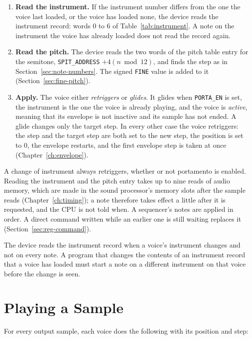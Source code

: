 \begin{enumerate}
	\item \textbf{Read the instrument.} If the instrument number differs from the one the voice last loaded, or the voice has
	      loaded none, the device reads the instrument record: words 0 to 6 of Table~\ref{tab:instrument}. A note on the
	      instrument the voice has already loaded does not read the record again.
	\item \textbf{Read the pitch.} The device reads the two words of the pitch table entry for the semitone,
	      \texttt{SPIT\_ADDRESS} $+ 4 (n \bmod 12)$, and finds the step as in Section~\ref{sec:note-numbers}. The signed
	      \texttt{FINE} value is added to it (Section~\ref{sec:fine-pitch}).
	\item \textbf{Apply.} The voice either \emph{retriggers} or \emph{glides}. It glides when \texttt{PORTA\_EN} is set, the
	      instrument is the one the voice is already playing, and the voice is \emph{active}, meaning that its envelope is not inactive and its sample has not ended. A glide changes only the target step. In every other case the voice retriggers: the step and the target
	      step are both set to the new step, the position is set to 0, the envelope restarts, and the first envelope step is taken
	      at once (Chapter~\ref{ch:envelope}).
\end{enumerate}

A change of instrument always retriggers, whether or not portamento is enabled. Reading the instrument and the pitch
entry takes up to nine reads of audio memory, which are made in the sound processor's memory slots after the sample
reads (Chapter~\ref{ch:timing}); a note therefore takes effect a little after it is requested, and the CPU is not told
when. A sequencer's notes are applied in order. A direct command written while an earlier one is still waiting replaces
it (Section~\ref{sec:reg-command}).

The device reads the instrument record when a voice's instrument changes and not on every note. A program that changes
the contents of an instrument record that a voice has loaded must start a note on a different instrument on that voice
before the change is seen.

\section{Playing a Sample}
\label{sec:playing}

For every output sample, each voice does the following with its position and step:

